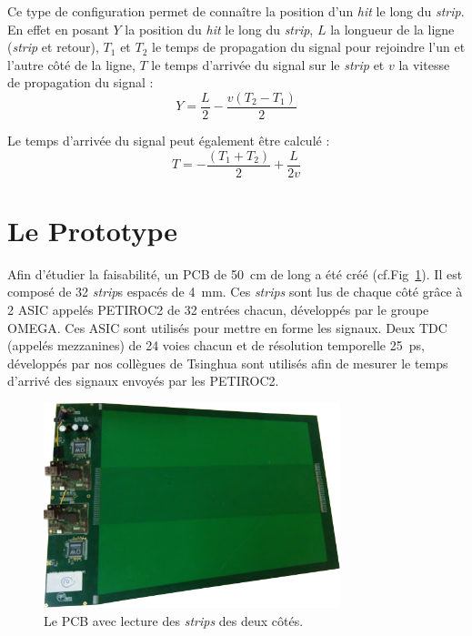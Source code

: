 Ce type de configuration permet de connaître la position d'un \textit{hit} le long du \textit{strip}. En effet en posant $Y$ la position du \textit{hit} le long du \textit{strip}, $L$ la longueur de la ligne (\textit{strip} et retour), $T_1$ et $T_2$ le temps de propagation du signal pour rejoindre l'un et l'autre côté de la ligne, $T$ le temps d'arrivée du signal sur le \textit{strip} et $v$ la vitesse de propagation du signal :
\begin{equation}
\label{eqqq}
Y=\frac{L}{2}-\frac{v(T_2-T_1)}{2}
\end{equation} 

Le temps d'arrivée du signal peut également être calculé :
\begin{equation}
\label{myformule}
T=-\frac{(T_1+T_2)}{2}+\frac{L}{2v}
\end{equation}

\section{Le Prototype}
Afin d'étudier la faisabilité, un PCB de \SI{50}{\centi\meter} de long a été créé (cf.Fig~\ref{PCB2}). Il est composé de \num{32} \textit{strip}s espacés de \SI{4}{\milli\meter}. Ces \textit{strips} sont lus de chaque côté grâce à \num{2} ASIC appelés PETIROC2 \cite{Monzo:2017quz} de \num{32} entrées chacun, développés par le groupe OMEGA. Ces ASIC sont utilisés pour mettre en forme les signaux. Deux TDC (appelés mezzanines) de \num{24} voies chacun et de résolution temporelle \SI{25}{\pico\second}, développés par nos collègues de Tsinghua sont utilisés afin de mesurer le temps d'arrivé des signaux envoyés par les PETIROC2.

\begin{figure}[ht!]
	\centering
	\includegraphics[width=0.77\textwidth]{ELE/PCB2.png}
	\captionsetup{type=figure}\caption{Le PCB avec lecture des \textit{strips} des deux côtés.}
	\label{PCB2}
\end{figure}

